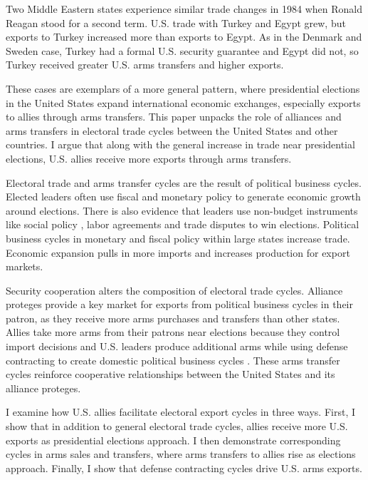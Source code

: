 \documentclass[12pt]{article}
\begin{document}
Two Middle Eastern states experience similar trade changes in 1984 when Ronald Reagan stood for a second term.
U.S. trade with Turkey and Egypt grew, but exports to Turkey increased more than exports to Egypt. 
As in the Denmark and Sweden case, Turkey had a formal U.S. security guarantee and Egypt did not, so Turkey received greater U.S. arms transfers and higher exports. 


These cases are exemplars of a more general pattern, where presidential elections in the United States expand international economic exchanges, especially exports to allies through arms transfers.
This paper unpacks the role of alliances and arms transfers in electoral trade cycles between the United States and other countries. 
I argue that along with the general increase in trade near presidential elections, U.S. allies receive more exports through arms transfers.


Electoral trade and arms transfer cycles are the result of political business cycles.
Elected leaders often use fiscal and monetary policy \citep{Nordhaus1975, Tufte1978, Rogoff1987, ClarkHallerberg2000} to generate economic growth around elections. 
There is also evidence that leaders use non-budget instruments like social policy \citep{Philips2020}, labor agreements \citep{Ahlquist2010} and trade disputes \citep{Conconietal2017} to win elections. 
Political business cycles in monetary and fiscal policy within large states increase trade. 
Economic expansion pulls in more imports and increases production for export markets. 


Security cooperation alters the composition of electoral trade cycles. 
Alliance proteges provide a key market for exports from political business cycles in their patron, as they receive more arms purchases and transfers than other states. 
Allies take more arms from their patrons near elections because they control import decisions and U.S. leaders produce additional arms while using defense contracting to create domestic political business cycles \citep{Tufte1978, Mintz1988, Mayer1995, DerouenHeo2000, Becker2021}.
These arms transfer cycles reinforce cooperative relationships between the United States and its alliance proteges.


I examine how U.S. allies facilitate electoral export cycles in three ways. 
First, I show that in addition to general electoral trade cycles, allies receive more U.S. exports as presidential elections approach.
I then demonstrate corresponding cycles in arms sales and transfers, where arms transfers to allies rise as elections approach.  
Finally, I show that defense contracting cycles drive U.S. arms exports. 
\end{document}
